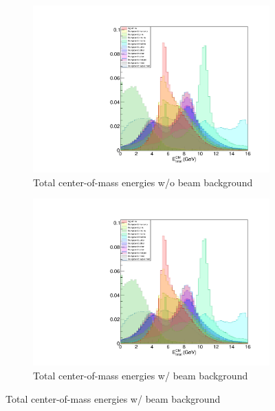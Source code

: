 \documentclass[12pt]{thesis}  %
\begin{document}
    
   \begin{figure}[h]
        \centering
        \begin{subfigure}[b]{0.475\textwidth}
            \centering
            \includegraphics[width=\textwidth]{images/test.pdf}
            \caption[Network2]%
            {{\small Total center-of-mass energies w/o beam background}}    
            \label{fig:mean and std of net14}
        \end{subfigure}
        \hfill
        \begin{subfigure}[b]{0.475\textwidth}  
            \centering 
            \includegraphics[width=\textwidth]{images/test.pdf}
            \caption[]%
            {{\small Total center-of-mass energies w/ beam background}}    
            \label{fig:mean and std of net24}
        \end{subfigure}
    \end{figure}
    
\end{document}
